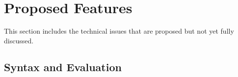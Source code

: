 %
%
%
%

\section{Proposed Features}

This section includes the technical issues that are proposed but not yet
fully discussed.

\subsection{Syntax and Evaluation}
